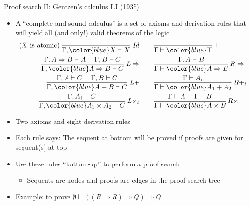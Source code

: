 \documentclass[english]{beamer}
\begin{document}
\begin{frame}{Proof search II: Gentzen's calculus LJ (1935)}

\begin{itemize}
\item A ``complete and sound calculus'' is a set of axioms and derivation
rules that will yield all (and only!) valid theorems of the logic
\begin{align*}
\text{(}X\text{ is atomic)\,}\frac{}{\Gamma,{\color{blue}X}\vdash X}\:Id & \qquad\frac{}{\Gamma\vdash{\color{blue}\top}}\,\top\\
\frac{\Gamma,A\Rightarrow B\vdash A\quad\;\Gamma,B\vdash C}{\Gamma,{\color{blue}A\Rightarrow B}\vdash C}\:L\Rightarrow & \qquad\frac{\Gamma,A\vdash B}{\Gamma\vdash{\color{blue}A\Rightarrow B}}\,R\Rightarrow\\
\frac{\Gamma,A\vdash C\quad\;\Gamma,B\vdash C}{\Gamma,{\color{blue}A+B}\vdash C}\:L+ & \qquad\frac{\Gamma\vdash A_{i}}{\Gamma\vdash{\color{blue}A_{1}+A_{2}}}\,R+_{i}\\
\frac{\Gamma,A_{i}\vdash C}{\Gamma,{\color{blue}A_{1}\times A_{2}}\vdash C}\:L\times_{i} & \qquad\frac{\Gamma\vdash A\quad\;\Gamma\vdash B}{\Gamma\vdash{\color{blue}A\times B}}\,R\times
\end{align*}
\item Two axioms and eight derivation rules
\item Each rule says: The sequent at bottom will be proved if proofs are
given for sequent(s) at top
\item Use these rules ``bottom-up'' to perform a proof search
\begin{itemize}
\item Sequents are nodes and proofs are edges in the proof search tree
\end{itemize}
\item Example: to prove $\emptyset\vdash\left(\left(R\Rightarrow R\right)\Rightarrow Q\right)\Rightarrow Q$
\end{itemize}
\end{frame}
\end{document}

